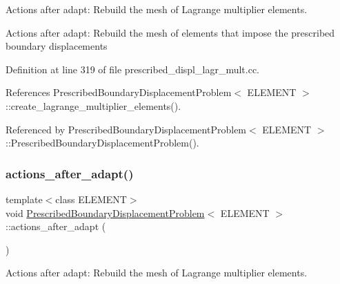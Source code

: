 Actions after adapt\+: Rebuild the mesh of Lagrange multiplier elements. 

Actions after adapt\+: Rebuild the mesh of elements that impose the prescribed boundary displacements 

Definition at line 319 of file prescribed\+\_\+displ\+\_\+lagr\+\_\+mult.\+cc.



References Prescribed\+Boundary\+Displacement\+Problem$<$ E\+L\+E\+M\+E\+N\+T $>$\+::create\+\_\+lagrange\+\_\+multiplier\+\_\+elements().



Referenced by Prescribed\+Boundary\+Displacement\+Problem$<$ E\+L\+E\+M\+E\+N\+T $>$\+::\+Prescribed\+Boundary\+Displacement\+Problem().

\mbox{\label{classPrescribedBoundaryDisplacementProblem_aae7225db18ad5c8429c0eb96fa37b585}} 
\subsubsection{\texorpdfstring{actions\+\_\+after\+\_\+adapt()}{actions\_after\_adapt()}\hspace{0.1cm}{\footnotesize\ttfamily [3/3]}}
{\footnotesize\ttfamily template$<$class E\+L\+E\+M\+E\+NT$>$ \\
void \hyperlink{classPrescribedBoundaryDisplacementProblem}{Prescribed\+Boundary\+Displacement\+Problem}$<$ E\+L\+E\+M\+E\+NT $>$\+::actions\+\_\+after\+\_\+adapt (\begin{DoxyParamCaption}{ }\end{DoxyParamCaption})}



Actions after adapt\+: Rebuild the mesh of Lagrange multiplier elements. 

\mbox{\label{classPrescribedBoundaryDisplacementProblem_a53e7d18d9d748388160d6c4106f1d493}} 
